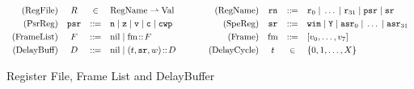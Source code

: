 \begin{figure}[!t]
	\small
	\[
		\begin{array}{rcclcrccl}
			\TYPE{(RegFile)} & \RFile & \in & 
			\TYPE{RegName} \rightharpoonup \TYPE{Val}
         & \quad \ \ &
        \TYPE{(RegName)} & \regN & \define &
		 \reg{0} \sepline \dots \sepline \reg{31} \sepline \psr \sepline \sr \\
		 \\[-9pt]
		
		\TYPE{(PsrReg)} & \psr & \define &
		\regn \sepline
			\regz \sepline
			\regv \sepline
			\regc \sepline \regcwp & \quad &
		\TYPE{(SpeReg)} & \sr & \define &
		\regwim \sepline
			\regY \sepline
\asr_0 \sepline \dots \sepline \asr_{31} \\ \\[-9pt]
		
		\TYPE{(FrameList)} & \Wstack & \define &
            \nil \sepline \fm \stCons \Wstack & \quad &
		\TYPE{(Frame)} & \fm & \define & [\val_0, \dots, \val_7] 
		\\ \\[-9pt]
		
		\TYPE{(DelayBuff)} & \DBuf & \define & \nil \sepline
                                  (\tick, \sr, \word) \dbCons \DBuf
                                  & \quad
		& \TYPE{(DelayCycle)} & \tick & \in & \{ 0, 1, \dots, X \}
		\end{array}
	\]

		
		
		
	\caption{Register File, Frame List and DelayBuffer}
	\label{fig:Register File and Frame List}
\end{figure}

